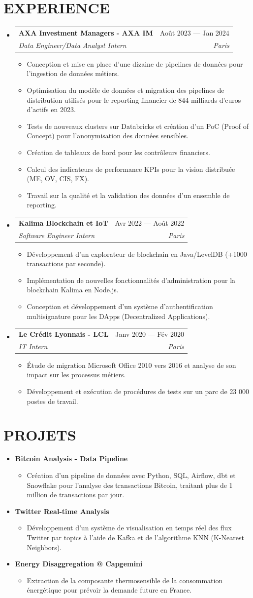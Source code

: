 \documentclass[11pt,a4paper]{article}
\makeatletter
\newcommand{\resumeItem}[1]{
  \item\small{
    {#1 \vspace{-1pt}}
  }
}
\newcommand{\resumeSubheading}[4]{
  \vspace{-1pt}\item
    \begin{tabular*}{\textwidth}[t]{l@{\extracolsep{\fill}}r}
      \textbf{#1} & #2 \\
      \textit{#3} & \textit{#4} \\
    \end{tabular*}\vspace{-4pt}
}
\newcommand{\resumeProjectHeading}[2]{
  \item
  {#1} \hfill {#2}
}
\newcommand{\resumeSubHeadingListStart}{\begin{itemize}[leftmargin=0in, label={}]}
\newcommand{\resumeSubHeadingListEnd}{\end{itemize}}
\newcommand{\resumeItemListStart}{\begin{itemize}[label={\textbullet}]}
\newcommand{\resumeItemListEnd}{\end{itemize}\vspace{0pt}}
\makeatother
\begin{document}
\section{EXPERIENCE}
\resumeSubHeadingListStart
    \resumeSubheading
      {AXA Investment Managers - AXA IM}{Août 2023 --- Jan 2024}
      {Data Engineer/Data Analyst Intern}{Paris}
      \resumeItemListStart
        \resumeItem{Conception et mise en place d'une dizaine de pipelines de données pour l'ingestion de données métiers.}
        \resumeItem{Optimisation du modèle de données et migration des pipelines de distribution utilisés pour le reporting financier de 844 milliards d'euros d'actifs en 2023.}
        \resumeItem{Tests de nouveaux clusters sur Databricks et création d'un PoC (Proof of Concept) pour l'anonymisation des données sensibles.}
        \resumeItem{Création de tableaux de bord pour les contrôleurs financiers.}
        \resumeItem{Calcul des indicateurs de performance KPIs pour la vision distribuée (ME, OV, CIS, FX).}
        \resumeItem{Travail sur la qualité et la validation des données d'un ensemble de reporting.}
      \resumeItemListEnd
    \resumeSubheading
      {Kalima Blockchain et IoT}{Avr 2022 --- Août 2022}
      {Software Engineer Intern}{Paris}
      \resumeItemListStart
        \resumeItem{Développement d'un explorateur de blockchain en Java/LevelDB (+1000 transactions par seconde).}
        \resumeItem{Implémentation de nouvelles fonctionnalités d'administration pour la blockchain Kalima en Node.js.}
        \resumeItem{Conception et développement d'un système d'authentification multisignature pour les DApps (Decentralized Applications).}
      \resumeItemListEnd
    \resumeSubheading
      {Le Crédit Lyonnais - LCL}{Janv 2020 --- Fév 2020}
      {IT Intern}{Paris}
      \resumeItemListStart
        \resumeItem{Étude de migration Microsoft Office 2010 vers 2016 et analyse de son impact sur les processus métiers.}
        \resumeItem{Développement et exécution de procédures de tests sur un parc de 23 000 postes de travail.}
      \resumeItemListEnd
  \resumeSubHeadingListEnd

\section{PROJETS}
\resumeSubHeadingListStart
    \resumeProjectHeading
      {\textbf{Bitcoin Analysis - Data Pipeline}} {}
      \resumeItemListStart
        \resumeItem{Création d'un pipeline de données avec Python, SQL, Airflow, dbt et Snowflake pour l'analyse des transactions Bitcoin, traitant plus de 1 million de transactions par jour.}
      \resumeItemListEnd
    \resumeProjectHeading
      {\textbf{Twitter Real-time Analysis}} {}
      \resumeItemListStart
        \resumeItem{Développement d'un système de visualisation en temps réel des flux Twitter par topics à l'aide de Kafka et de l'algorithme KNN (K-Nearest Neighbors).}
      \resumeItemListEnd
    \resumeProjectHeading
      {\textbf{Energy Disaggregation @ Capgemini}} {}
      \resumeItemListStart
        \resumeItem{Extraction de la composante thermosensible de la consommation énergétique pour prévoir la demande future en France.}
      \resumeItemListEnd
\resumeSubHeadingListEnd
\end{document}
